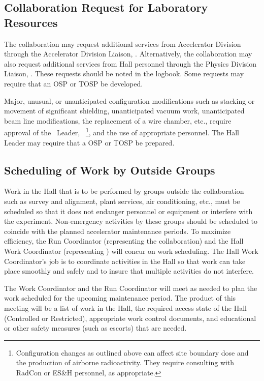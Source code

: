\documentclass[11pt]{article}
\begin{document}
\subsection{Collaboration Request for Laboratory Resources}
\indent

The collaboration may request additional services from Accelerator
Division through the Accelerator Division Liaison, \ACCDIVLIAISON.  Alternatively,
the collaboration may also request additional services from Hall personnel 
through the Physics Division Liaison, \PHYSDIVLIAISON. These requests 
should be noted in the logbook. Some requests may require that an
OSP or TOSP be developed.

Major, unusual, or unanticipated configuration modifications such as stacking 
or movement of significant shielding, unanticipated vacuum work, unanticipated
beam line modifications, the replacement of a wire chamber, etc., require 
approval of the \HALL\ Leader, \HALLLEADER\ 
\footnote{\label{fn1}Configuration changes as outlined above can affect site
boundary dose and the production of airborne radioactivity. They require
consulting with RadCon or ES\&H personnel, as appropriate.}, and the use of 
appropriate personnel. The Hall Leader may require that a OSP or 
TOSP be prepared.

\subsection{Scheduling of Work by Outside Groups }
\indent

Work in the Hall that is to be performed by groups outside the collaboration 
such as survey and alignment, plant services, air conditioning, etc., 
must be scheduled so that it does not 
endanger personnel or equipment or interfere with the experiment.
Non-emergency activities by these groups should be
scheduled to coincide with the planned accelerator maintenance periods. 
To maximize efficiency, the Run Coordinator (representing the collaboration)
and the Hall Work Coordinator (representing \HALL) will concur
on work scheduling.
The Hall Work Coordinator's job is to 
coordinate activities in the Hall so that work can take place smoothly 
and safely and to insure that multiple activities do not interfere. 

The Work Coordinator and the Run
Coordinator will meet as needed to plan the work
scheduled for the upcoming maintenance period.
The product of this meeting will be
a list of work in the Hall, the required access state of the
Hall (Controlled or Restricted), appropriate work 
control documents, and educational or other
safety measures (such as escorts) that are needed.
\end{document}
